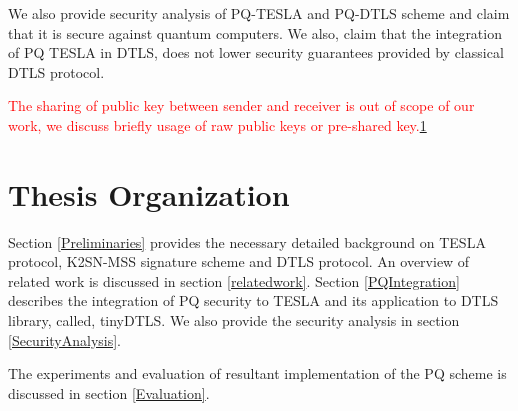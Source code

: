 We also provide security analysis of PQ-TESLA and PQ-DTLS scheme and claim that it is secure against quantum computers. We also, claim that the integration of PQ TESLA in DTLS, does not lower security guarantees provided by classical DTLS protocol. 

\textcolor{red}{The sharing of public key between sender and receiver is out of scope of our work, we discuss briefly usage of raw public keys or pre-shared key.}\ref{}





\section{Thesis Organization }
Section \ref{Preliminaries} provides the necessary detailed background on TESLA protocol, K2SN-MSS signature scheme and DTLS protocol. An overview of related work is discussed in section \ref{relatedwork}. Section \ref{PQIntegration} describes the integration of PQ security to TESLA and its application to DTLS library, called, tinyDTLS. We also provide the security analysis in section \ref{SecurityAnalysis}.

The experiments and evaluation of resultant implementation of the PQ scheme is discussed in section \ref{Evaluation}.\\
